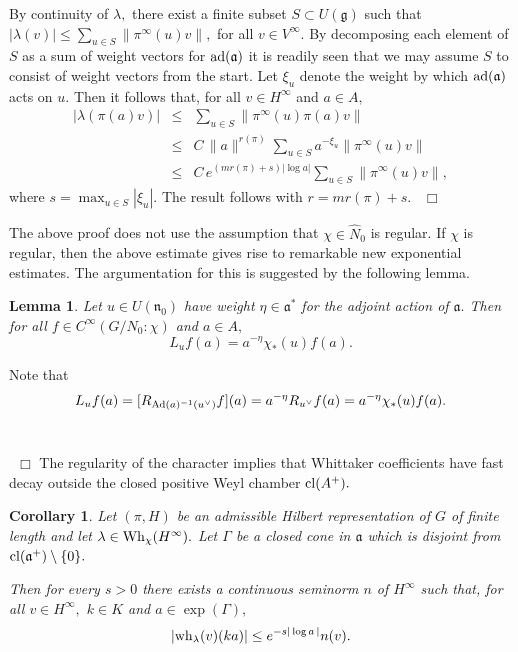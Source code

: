 \documentclass[12pt,a4paper]{article}
\newtheorem{Cor}[Thm]{Corollary}
\newtheorem{Lemma}[Thm]{Lemma}
\newenvironment{cor}[0]{\begin{Cor}\noindent}%
{\end{Cor}}
\newenvironment{lemma}[0]{\begin{Lemma}\noindent}%
{\end{Lemma}}
\def\proof{\par\noindent{\it Proof.}{\ }{\ }}
\def\qed{~\hfill\hbox{$\Box$}\medbreak}
\def\gl{\lambda}
\def\got#1{\mathfrak #1}
\def\fa{{\got a}}
\def\fg{{\got g}}
\def\fn{{\got n}}
\def\Ad{{\rm Ad}}
\def\ad{{\rm ad}}
\numberwithin{Thm}{section}
\numberwithin{equation}{section}
\def\Wh{{\rm Wh}}
\numberwithin{equation}{section}
\def\cl{{\rm cl}}
\def\wh{{\rm wh}}
\def\col{\!:\!}
\def\cchi{\chi}
\def\veec{\vee}%
\begin{document}
By continuity of $\gl,$ there exist a finite subset $S \subset U(\fg)$ 
such that 
$|\gl(v)| \leq \sum_{u \in S} \|\pi^\infty(u) v\|, $ for all $v \in V^\infty.$
By decomposing each element of $S$ as a sum of weight vectors for 
$\ad(\fa)$ it is readily seen that we may assume $S$ to consist of weight vectors
from the start. Let $\xi_u$ denote the weight by which $\ad(\fa)$ acts on $u.$ 
Then it follows that, for all $v \in H^\infty$ and $a \in A,$ 
\begin{eqnarray*}
| \gl(\pi(a) v)| & \leq & \sum_{u\in S} \|\pi^\infty(u) \pi(a)v \| \\
&\leq&
C\, \|a\|^{r(\pi)}  \sum_{u \in S} a^{-\xi_u} \|\pi^\infty(u) v\| \\
&\leq & 
C\, e^{(m r(\pi)  + s) |\log a| }  \sum_{u \in S} \| \pi^\infty(u) v\|,
\end{eqnarray*}
where $s = \max_{u \in S} |\xi_u|.$ 
The result follows with $r = m r(\pi) + s.$ 
\qed


The above proof does not use the assumption that $\cchi \in \widehat N_0$ 
is regular.
If  $\cchi$ is regular, then the above estimate
gives rise to remarkable new exponential estimates. The argumentation for this
is suggested by the following lemma.

\begin{lemma}
\label{l: nilpotent trick}
Let $u \in U(\fn_0)$ have weight $\eta \in \fa^*$ for the adjoint action
of $\fa.$ Then for all $f \in C^\infty(G/N_0\col \cchi)$ and $a \in A,$ 
$$ 
L_u f(a) = a^{-\eta} \cchi_*(u) f(a).
$$%
\end{lemma}

\proof 
Note that 
$$
L_u f(a) = [R_{\Ad(a)^{-1} (u^\veec)} f](a)  = a^{-\eta} R_{u^\veec} f(a) = a^{-\eta} \cchi_*(u) f(a).
$$ 
\vspace{-40pt} {\ }

\qed
\medbreak
The regularity of the character implies that Whittaker coefficients have fast
decay outside the closed positive Weyl chamber $\cl (A^+).$ 

\begin{cor}
\label{c: rapid descent}
Let $(\pi, H)$ be an admissible Hilbert representation of $G$ of finite length
and let $\gl \in \Wh_\chi(H^\infty).$ 
Let $\Gamma$ be a closed cone in $\fa$ which is disjoint from $\cl(\fa^+)\setminus \{0\}.$ 

Then for every $s > 0$ there exists a continuous seminorm $n$ of $H^\infty$ such 
that, for all $v \in H^\infty,$ $k \in K$ and $a \in \exp (\Gamma),$ 
\begin{equation}
\label{e: rapid decay wh} 
|\wh_\gl(v)(ka)| \leq  e^{-s|\log a\, |} n(v).
\end{equation}  
\end{cor}
\end{document}
